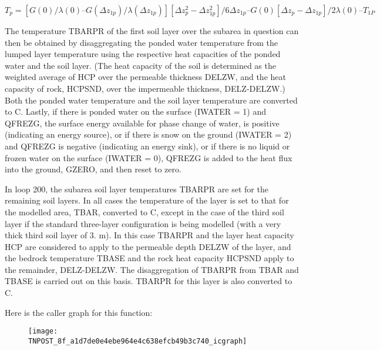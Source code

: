 $T_p = [G(0)/ \lambda(0) – G(\Delta z_{1p})/ \lambda(\Delta z_{1p})] [\Delta z_p^2 - \Delta z_{1p}^2]/ 6 \Delta z_{1p} – G(0) [\Delta z_p - \Delta z_{1p}]/ 2 \lambda(0) – T_{1P}$

The temperature T\+B\+A\+R\+P\+R of the first soil layer over the subarea in question can then be obtained by disaggregating the ponded water temperature from the lumped layer temperature using the respective heat capacities of the ponded water and the soil layer. (The heat capacity of the soil is determined as the weighted average of H\+C\+P over the permeable thickness D\+E\+L\+Z\+W, and the heat capacity of rock, H\+C\+P\+S\+N\+D, over the impermeable thickness, D\+E\+L\+Z-\/\+D\+E\+L\+Z\+W.) Both the ponded water temperature and the soil layer temperature are converted to C. Lastly, if there is ponded water on the surface (I\+W\+A\+T\+E\+R = 1) and Q\+F\+R\+E\+Z\+G, the surface energy available for phase change of water, is positive (indicating an energy source), or if there is snow on the ground (I\+W\+A\+T\+E\+R = 2) and Q\+F\+R\+E\+Z\+G is negative (indicating an energy sink), or if there is no liquid or frozen water on the surface (I\+W\+A\+T\+E\+R = 0), Q\+F\+R\+E\+Z\+G is added to the heat flux into the ground, G\+Z\+E\+R\+O, and then reset to zero.

In loop 200, the subarea soil layer temperatures T\+B\+A\+R\+P\+R are set for the remaining soil layers. In all cases the temperature of the layer is set to that for the modelled area, T\+B\+A\+R, converted to C, except in the case of the third soil layer if the standard three-\/layer configuration is being modelled (with a very thick third soil layer of 3. m). In this case T\+B\+A\+R\+P\+R and the layer heat capacity H\+C\+P are considered to apply to the permeable depth D\+E\+L\+Z\+W of the layer, and the bedrock temperature T\+B\+A\+S\+E and the rock heat capacity H\+C\+P\+S\+N\+D apply to the remainder, D\+E\+L\+Z-\/\+D\+E\+L\+Z\+W. The disaggregation of T\+B\+A\+R\+P\+R from T\+B\+A\+R and T\+B\+A\+S\+E is carried out on this basis. T\+B\+A\+R\+P\+R for this layer is also converted to C.

Here is the caller graph for this function\+:\nopagebreak
\begin{figure}[H]
\begin{center}
\leavevmode
\texttt{[image: TNPOST\_8f\_a1d7de0e4ebe964e4c638efcb49b3c740\_icgraph]}
\end{center}
\end{figure}


